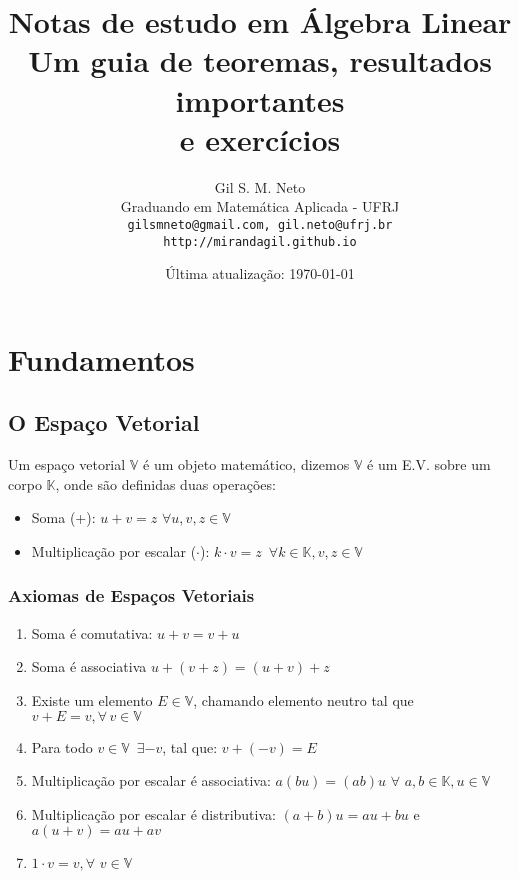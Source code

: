 \documentclass{article}
\title{Notas de estudo em Álgebra Linear\\ Um guia de teoremas, resultados importantes\\ e exercícios}
\author{
  Gil S. M. Neto\\
  Graduando em Matemática Aplicada - UFRJ\\
  \texttt{gilsmneto@gmail.com, gil.neto@ufrj.br}\\
  \texttt{http://mirandagil.github.io}
}
\date{Última atualização: \today}
\theoremstyle{plain}
\theoremstyle{remark}
\numberwithin{equation}{section}
\numberwithin{thm}{section}
\numberwithin{defn}{section}
\numberwithin{lemma}{section}
\numberwithin{axm}{section}
\begin{document}
\maketitle

\tableofcontents
\newpage

\section{Fundamentos}

\subsection{O Espaço Vetorial}

Um espaço vetorial \(\mathbb{V}\) é um objeto matemático, dizemos \( \mathbb{V}\) é um E.V. sobre um corpo \(\mathbb{K}\), onde são definidas duas operações:

\begin{itemize}
	\item Soma (+): \(u+v = z \, \,\forall  u,v, z \in \mathbb{V}\)
	\item Multiplicação por escalar (\(\cdot\)): \(k\cdot v = z \, \, \, \forall k \in \mathbb{K}, v,z \in \mathbb{V}\)
\end{itemize}

\subsubsection*{Axiomas de Espaços Vetoriais}
\begin{enumerate}
\item Soma é comutativa: \(u+v = v+u\)
\item Soma é associativa \( u+(v+z) = (u+v)+z\)
\item Existe um elemento  \(E \in \mathbb{V}\), chamando elemento neutro tal que \(v + E = v, \forall \, v \in \mathbb{V}\)
\item Para todo \(v \in \mathbb{V} \,\,\, \exists -v\), tal que: \(v + (-v) = E\)
\item Multiplicação por escalar é associativa: \( a(b u) = (ab) u \, \, \forall \, \,  a, b \in \mathbb{K}, u \in \mathbb{V}\)
\item Multiplicação por escalar é distributiva: \( (a+b)u = au + bu \) e \(a(u+v) = au + av\)
\item \( 1 \cdot v = v, \forall \, \, v \in \mathbb{V} \)
\end{enumerate}
\end{document}
